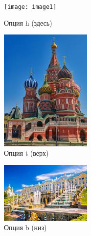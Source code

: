 \documentclass{article}
\begin{document}
\lipsum[1-2]
\begin{figure}[h]
    \centering
    \texttt{[image: image1]}
    \caption{Опция h (здесь)}
\end{figure}
\lipsum[3]
\begin{figure}[t]
    \centering
    \includegraphics[width=0.4\textwidth]{image2}
    \caption{Опция t (верх)}
\end{figure}
\begin{figure}[b]
    \centering
    \includegraphics[width=0.4\textwidth]{image3}
    \caption{Опция b (низ)}
\end{figure}
\lipsum[4-8]
\end{document}
